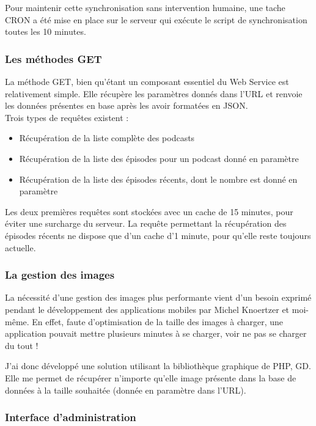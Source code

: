 \documentclass[11pt, french]{report}
\begin{document}
Pour maintenir cette synchronisation sans intervention humaine, une tache CRON a été mise en place sur le serveur qui exécute le script de synchronisation toutes les 10 minutes.

\subsubsection{Les méthodes GET}

La méthode GET, bien qu'étant un composant essentiel du Web Service est relativement simple. Elle récupère les paramètres donnés dans l'URL et renvoie les données présentes en base après les avoir formatées en JSON.\\

Trois types de requêtes existent :
\begin{itemize}
	\item Récupération de la liste complète des podcasts
	\item Récupération de la liste des épisodes pour un podcast donné en paramètre
	\item Récupération de la liste des épisodes récents, dont le nombre est donné en paramètre\\
\end{itemize}

Les deux premières requêtes sont stockées avec un cache de 15 minutes, pour éviter une surcharge du serveur. La requête permettant la récupération des épisodes récents ne dispose que d'un cache d'1 minute, pour qu'elle reste toujours actuelle.

\subsubsection{La gestion des images}

La nécessité d'une gestion des images plus performante vient d'un besoin exprimé pendant le développement des applications mobiles par Michel Knoertzer et moi-même. En effet, faute d'optimisation de la taille des images à charger, une application pouvait mettre plusieurs minutes à se charger, voir ne pas se charger du tout !

J'ai donc développé une solution utilisant la bibliothèque graphique de PHP, GD. Elle me permet de récupérer n'importe qu'elle image présente dans la base de données à la taille souhaitée (donnée en paramètre dans l'URL).

\subsubsection{Interface d'administration}
\end{document}

